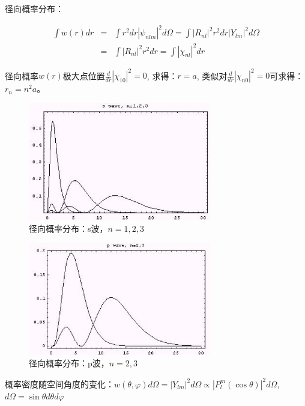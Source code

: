 径向概率分布：

\begin{eqnarray*}
\int w(r) dr &= & \int {r^2 dr\left| {\psi _{nlm} } \right|^2 d\Omega }  = \int {\left| {R_{nl} } \right|^2 r^2 dr\left| {Y_{lm} } \right|^2 d\Omega } \\
{} & = & \int \left| {R_{nl} } \right|^2 r^2 dr = \int \left| {\chi _{nl} } \right|^2 dr
\end{eqnarray*}

径向概率$w(r)$极大点位置$\frac{d}{{dr}}\left| {\chi _{10} } \right|^2  = 0$, 求得：$r = a$, 类似对$\frac{d}{{dr}}\left| {\chi _{n0} } \right|^2  = 0$可求得：$r_n  = n^2 a$。

\begin{figure}[h]
\begin{center}
\includegraphics[clip,width=8cm]{HydrogenAtom/15-1.ps}
\caption{径向概率分布：s波，$n=1,2,3$}
\end{center}
\end{figure}

\begin{figure}[h]
\begin{center}
\includegraphics[clip,width=8cm]{HydrogenAtom/15-2.ps}
\caption{径向概率分布：p波，$n=2,3$}
\end{center}
\end{figure}


概率密度随空间角度的变化：$w(\theta ,\varphi ) d \Omega = \left| {Y_{lm} } \right|^2 d\Omega  \propto \left| {P_l^m \left( {\cos \theta } \right)} \right|^2 d\Omega $, $d\Omega  = \sin \theta d\theta d\varphi $

